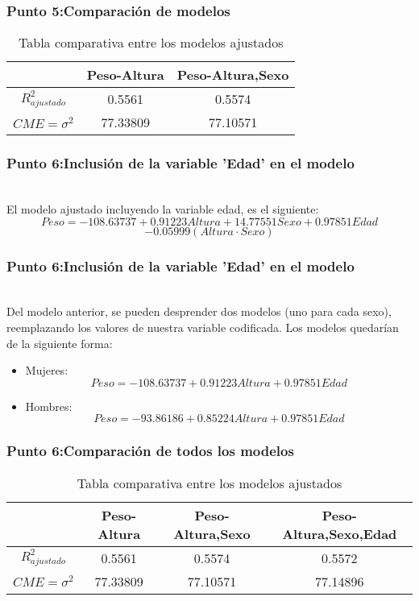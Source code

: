 \documentclass[12pt]{beamer}
\begin{document}
\begin{frame}
\frametitle{Punto 5:Comparación de modelos}
\begin{table}[!htb]
\caption{Tabla comparativa entre los modelos ajustados}\label{Tabla1}
\begin{center}
\begin{tabular}{ccc}
\hline
 & Peso-Altura & Peso-Altura,Sexo \\ 
\hline
$R^2_{ajustado}$ & 0.5561 & 0.5574 \\ 
 
$CME=\sigma^2$ & 77.33809 & 77.10571 \\ 
\hline 
\end{tabular}
\end{center}
\end{table}
\end{frame}

\begin{frame}
\frametitle{Punto 6:Inclusión de la variable 'Edad' en el modelo}
~\\ El modelo ajustado incluyendo la variable edad, es el siguiente:
~\\ $$Peso=-108.63737+0.91223 Altura+14.77551 Sexo+0.97851 Edad$$
$$-0.05999(Altura\cdot Sexo)$$
\end{frame}

\begin{frame}
\frametitle{Punto 6:Inclusión de la variable 'Edad' en el modelo}
~\\ Del modelo anterior, se pueden desprender dos modelos (uno para cada sexo), reemplazando los valores de nuestra variable codificada. Los modelos quedarían de la siguiente forma:
\begin{itemize}
\item Mujeres: $$Peso=-108.63737+0.91223 Altura+0.97851 Edad$$
\item Hombres: $$Peso=-93.86186+0.85224 Altura+0.97851 Edad$$
\end{itemize}
\end{frame}

\begin{frame}
\frametitle{Punto 6:Comparación de todos los modelos}
\begin{table}[!htb]
\centering
\caption{Tabla comparativa entre los modelos ajustados}\label{Tabla1}
\resizebox{12cm}{!} {
\begin{tabular}{cccc}
\hline
 &Peso-Altura&Peso-Altura,Sexo&Peso-Altura,Sexo,Edad \\ 
\hline
$R^2_{ajustado}$ &0.5561&0.5574&0.5572 \\ 
 
$CME=\sigma^2$ &77.33809&77.10571&77.14896 \\ 
\hline 
\end{tabular}
}
\end{table}
\end{frame}
\end{document}
